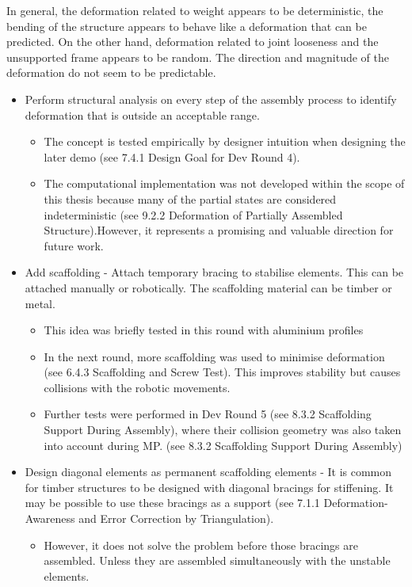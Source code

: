 In general, the deformation related to weight appears to be deterministic, the bending of the structure appears to behave like a deformation that can be predicted. On the other hand, deformation related to joint looseness and the unsupported frame appears to be random. The direction and magnitude of the deformation do not seem to be predictable.
\begin{itemize}
    \item Perform structural analysis on every step of the assembly process to identify deformation that is outside an acceptable range.
    \begin{itemize}
        \item The concept is tested empirically by designer intuition when designing the later demo (see 7.4.1 Design Goal for Dev Round 4).
        \item The computational implementation was not developed within the scope of this thesis because many of the partial states are considered indeterministic (see 9.2.2 Deformation of Partially Assembled Structure).However, it represents a promising and valuable direction for future work.
    \end{itemize}
    \item Add scaffolding - Attach temporary bracing to stabilise elements. This can be attached manually or robotically. The scaffolding material can be timber or metal. 
    \begin{itemize}
        \item This idea was briefly tested in this round with aluminium profiles
        \item In the next round, more scaffolding was used to minimise deformation (see 6.4.3 Scaffolding and Screw Test). This improves stability but causes collisions with the robotic movements. 
        \item Further tests were performed in Dev Round 5 (see 8.3.2 Scaffolding Support During Assembly), where their collision geometry was also taken into account during MP. (see 8.3.2 Scaffolding Support During Assembly)
    \end{itemize}
    \item Design diagonal elements as permanent scaffolding elements - It is common for timber structures to be designed with diagonal bracings for stiffening. It may be possible to use these bracings as a support (see 7.1.1 Deformation-Awareness and Error Correction by Triangulation).
    \begin{itemize}
        \item However, it does not solve the problem before those bracings are assembled. Unless they are assembled simultaneously with the unstable elements.

\end{itemize}
\end{itemize}
